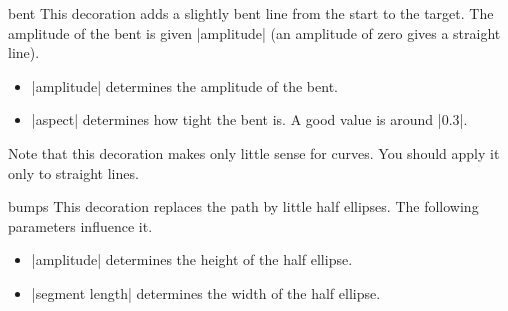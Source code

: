 \begin{decoration}{bent}
  This decoration adds a slightly bent line from the start to the
  target. The amplitude of the bent is given |amplitude|
  (an amplitude of zero gives a straight line).
  \begin{itemize}
  \item |amplitude|
    determines the amplitude of the bent.
  \item |aspect|
    determines how tight the bent is. A good value is around |0.3|.
  \end{itemize}
  Note that this decoration makes only little sense for curves. You
  should apply it only to straight lines.
\begin{codeexample}[]
\end{codeexample}
\begin{codeexample}[]
\end{codeexample}
\end{decoration}


\begin{decoration}{bumps}
  This decoration replaces the path by little half ellipses. The
  following parameters influence it.
  \begin{itemize}
  \item |amplitude|
    determines the height of the half ellipse.
  \item |segment length|
    determines the width of the half ellipse.
  \end{itemize}
\begin{codeexample}[]
\end{codeexample}
\end{decoration}


